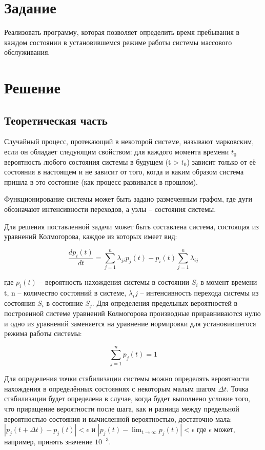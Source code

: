 \documentclass[12pt]{report}
\begin{document}
	
	\setcounter{page}{2}

\chapter{Задание}
Реализовать программу, которая позволяет определить время пребывания в каждом состоянии в установившемся режиме работы системы массового обслуживания.

\chapter{Решение}
\section{Теоретическая часть}

Случайный процесс, протекающий в некоторой системе, называют марковским, если он обладает следующим свойством: для каждого момента времени $t_0$ вероятность любого состояния системы в будущем (t > $t_0$) зависит только от её состояния в настоящем и не зависит от того, когда и каким образом система пришла в это состояние (как процесс развивался в прошлом).

Функционирование системы может быть задано размеченным графом, где дуги обозначают интенсивности переходов, а узлы – состояния системы.

Для решения поставленной задачи может быть составлена система, состоящая из уравнений Колмогорова, каждое из которых имеет вид:

\begin{equation}
	\frac{dp_i (t)}{dt} = \sum_{j=1}^{n} \lambda_{ji} p_j (t) - p_i (t) \sum_{j=1}^{n} \lambda_{ij}
\end{equation}

где $p_i (t)$ – вероятность нахождения системы в состоянии $S_i$ в момент времени t, n – количество состояний в системе, $\lambda_ij$ – интенсивность перехода системы из состояния $S_i$ в состояние $S_j$.
Для определения предельных вероятностей в построенной системе уравнений Колмогорова производные приравниваются нулю и одно из уравнений заменяется на уравнение нормировки для установившегося режима работы системы:

\begin{equation}
	\sum_{j=1}^{n} p_j (t) = 1
\end{equation}

Для определения точки стабилизации системы можно определять вероятности нахождения в определённых состояниях с некоторым малым шагом $\Delta t$. Точка стабилизации будет определена в случае, когда будет выполнено условие того, что приращение вероятности после шага, как и разница между предельной вероятностью состояния и вычисленной вероятностью, достаточно мала: $|p_j (t + \Delta t) - p_j (t)| < \epsilon$ и $|p_j (t) - \lim_{t\to\infty}p_j (t)| < \epsilon$ где $ \epsilon $ может, например, принять значение $10^{-3}$.
\end{document}
